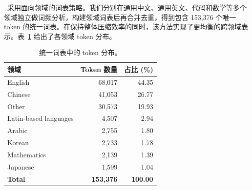 \modelname~采用面向领域的词表策略。我们分别在通用中文、通用英文、代码和数学等多个领域独立做词频分析，构建领域词表后再合并去重，得到包含 153,376 个唯一 token 的统一词表。在保持整体压缩效率的同时，该方法实现了更均衡的跨领域表示。表~\ref{tab:vocab_distribution} 给出了各领域 token 分布。
\begin{table}[htbp]
\centering
\caption{\modelname 统一词表中的 token 分布。}
\label{tab:vocab_distribution}
\small
\begin{tabular}{lrr}
\toprule
\textbf{领域} & \textbf{Token 数量} & \textbf{占比 (\%)} \\
\midrule
English & 68,017 & 44.35 \\
Chinese & 41,053 & 26.77 \\
Other & 30,573 & 19.93 \\
Latin-based languages & 4,507 & 2.94 \\
Arabic & 2,755 & 1.80 \\
Korean & 2,733 & 1.78 \\
Mathematics & 2,139 & 1.39 \\
Japanese & 1,599 & 1.04 \\

\midrule
\textbf{Total} & \textbf{153,376} & \textbf{100.00} \\
\bottomrule
\end{tabular}
\end{table}
